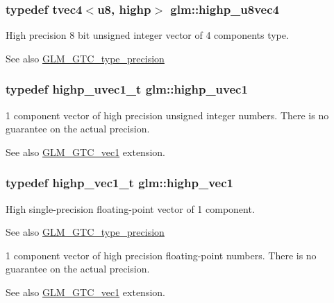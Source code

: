 \subsubsection[{highp\+\_\+u8vec4}]{\setlength{\rightskip}{0pt plus 5cm}typedef tvec4$<${\bf u8}, highp$>$ {\bf glm\+::highp\+\_\+u8vec4}}\label{namespaceglm_adfad96397d5689c0c925dacf0f302da0}
High precision 8 bit unsigned integer vector of 4 components type. \begin{DoxySeeAlso}{See also}
\hyperlink{group__gtc__type__precision}{G\+L\+M\+\_\+\+G\+T\+C\+\_\+type\+\_\+precision} 
\end{DoxySeeAlso}
\hypertarget{namespaceglm_a2a480125ab05aa522d883651ea1101f8}{}
\subsubsection[{highp\+\_\+uvec1}]{\setlength{\rightskip}{0pt plus 5cm}typedef highp\+\_\+uvec1\+\_\+t {\bf glm\+::highp\+\_\+uvec1}}\label{namespaceglm_a2a480125ab05aa522d883651ea1101f8}
1 component vector of high precision unsigned integer numbers. There is no guarantee on the actual precision. \begin{DoxySeeAlso}{See also}
\hyperlink{group__gtc__vec1}{G\+L\+M\+\_\+\+G\+T\+C\+\_\+vec1} extension. 
\end{DoxySeeAlso}
\hypertarget{namespaceglm_ab3f08c031846e7a95b49e81c48d920d3}{}
\subsubsection[{highp\+\_\+vec1}]{\setlength{\rightskip}{0pt plus 5cm}typedef highp\+\_\+vec1\+\_\+t {\bf glm\+::highp\+\_\+vec1}}\label{namespaceglm_ab3f08c031846e7a95b49e81c48d920d3}
High single-\/precision floating-\/point vector of 1 component. \begin{DoxySeeAlso}{See also}
\hyperlink{group__gtc__type__precision}{G\+L\+M\+\_\+\+G\+T\+C\+\_\+type\+\_\+precision}
\end{DoxySeeAlso}
1 component vector of high precision floating-\/point numbers. There is no guarantee on the actual precision. \begin{DoxySeeAlso}{See also}
\hyperlink{group__gtc__vec1}{G\+L\+M\+\_\+\+G\+T\+C\+\_\+vec1} extension. 
\end{DoxySeeAlso}
\hypertarget{namespaceglm_ad48b331956b3890e02bf05a028d4869e}{}
